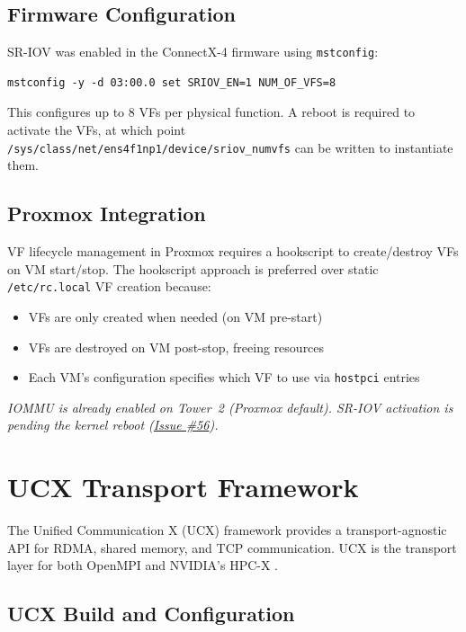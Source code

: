 \documentclass[10pt,letterpaper]{article}
\begin{document}
\subsection{Firmware Configuration}

SR-IOV was enabled in the ConnectX-4 firmware using \texttt{mstconfig}:

\begin{verbatim}
mstconfig -y -d 03:00.0 set SRIOV_EN=1 NUM_OF_VFS=8
\end{verbatim}

This configures up to 8 VFs per physical function. A reboot is required to activate the VFs, at which point \texttt{/sys/class/net/ens4f1np1/device/sriov\_numvfs} can be written to instantiate them.

\subsection{Proxmox Integration}

VF lifecycle management in Proxmox requires a hookscript \cite{pve-hookscript-sriov} to create/destroy VFs on VM start/stop. The hookscript approach is preferred over static \texttt{/etc/rc.local} VF creation because:

\begin{itemize}[noitemsep]
    \item VFs are only created when needed (on VM pre-start)
    \item VFs are destroyed on VM post-stop, freeing resources
    \item Each VM's configuration specifies which VF to use via \texttt{hostpci} entries
\end{itemize}

\textit{IOMMU is already enabled on Tower~2 (Proxmox default). SR-IOV activation is pending the kernel reboot (\href{https://github.com/ndg8743/ScuffedRDMA/issues/56}{Issue \#56}).}

\section{UCX Transport Framework}

The Unified Communication X (UCX) framework \cite{ucx-repo} provides a transport-agnostic API for RDMA, shared memory, and TCP communication. UCX is the transport layer for both OpenMPI and NVIDIA's HPC-X \cite{hpcx-docs}.

\subsection{UCX Build and Configuration}
\end{document}
